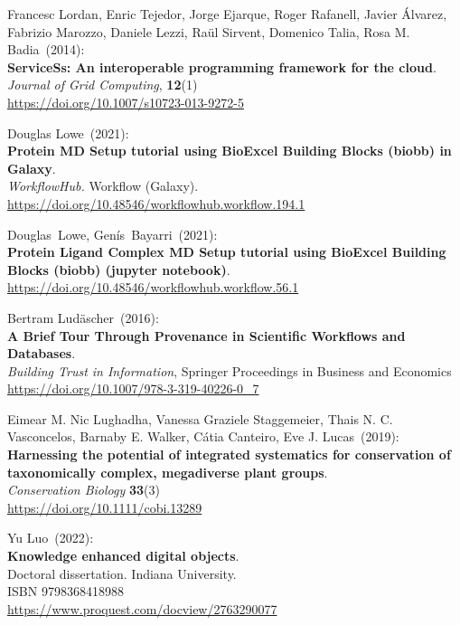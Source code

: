 \begin{thebibliography}{9}
Francesc Lordan, Enric Tejedor, Jorge Ejarque, Roger
Rafanell, Javier Álvarez, Fabrizio Marozzo, Daniele Lezzi, Raül Sirvent,
Domenico Talia, Rosa M. Badia~(2014): \\
\textbf{ServiceSs: An interoperable programming framework for the
cloud}.\\
\emph{Journal of Grid Computing}, \textbf{12}(1)\\
\url{https://doi.org/10.1007/s10723-013-9272-5}

Douglas Lowe~(2021): \\
\textbf{Protein MD Setup tutorial using BioExcel Building Blocks (biobb)
in Galaxy}.\\
\emph{WorkflowHub.} Workflow (Galaxy).\\
\url{https://doi.org/10.48546/workflowhub.workflow.194.1}

Douglas~Lowe, Genís~Bayarri~(2021): \\
\textbf{Protein Ligand Complex MD Setup tutorial using BioExcel Building
Blocks (biobb) (jupyter notebook)}.\\
\url{https://doi.org/10.48546/workflowhub.workflow.56.1}

Bertram Ludäscher~(2016): \\
\textbf{A Brief Tour Through Provenance in Scientific Workflows and Databases}.\\
\emph{Building Trust in Information}, Springer Proceedings in Business and Economics \\
\url{https://doi.org/10.1007/978-3-319-40226-0_7}

Eimear M. Nic Lughadha, Vanessa Graziele Staggemeier, Thais N. C. Vasconcelos, Barnaby E. Walker, Cátia Canteiro, Eve J. Lucas~(2019): \\
\textbf{Harnessing the potential of integrated systematics for conservation of taxonomically complex, megadiverse plant groups}.\\ 
\emph{Conservation Biology} \textbf{33}(3)\\
\url{https://doi.org/10.1111/cobi.13289}

Yu Luo~(2022): \\
\textbf{Knowledge enhanced digital objects}.\\
Doctoral dissertation. Indiana University.\\
ISBN 9798368418988 \\
\url{https://www.proquest.com/docview/2763290077}


\end{thebibliography}
